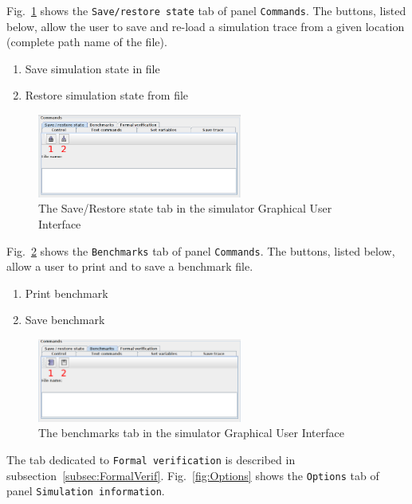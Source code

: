 \documentclass{llncs}
\begin{document}
%
Fig.~\ref{fig:CmdSaveState} shows the \texttt{Save/restore state} tab of panel \texttt{Commands}. The buttons, listed
below, allow the user to save and re-load a simulation trace from a given location (complete path name of the file).
%
\begin{enumerate}
	\item Save simulation state in file
	\item Restore simulation state from file
\end{enumerate}
%
\begin{figure}[!htbp]
	\centering
	\includegraphics[width=0.6\textwidth]{figures/screenshot/CmdSaveState.png}
	\caption{The Save/Restore state tab in the simulator Graphical User Interface}
	\label{fig:CmdSaveState}
\end{figure}
%
Fig.~\ref{fig:CmdBenchmarks} shows the \texttt{Benchmarks} tab of panel \texttt{Commands}. The buttons, listed below,
allow a user to print and to save a benchmark file.
%
\begin{enumerate}
	\item Print benchmark
	\item Save benchmark
\end{enumerate}
%
\begin{figure}[!htbp]
	\centering
	\includegraphics[width=0.6\textwidth]{figures/screenshot/CmdBenchmarks.pdf}
	\caption{The benchmarks tab in the simulator Graphical User Interface}
	\label{fig:CmdBenchmarks}
\end{figure}
%
The tab dedicated to \texttt{Formal verification} is described in subsection~\ref{subsec:FormalVerif}.
%
\clearpage
%
Fig.~\ref{fig:Options} shows the \texttt{Options} tab of panel \texttt{Simulation information}.
%
\end{document}

